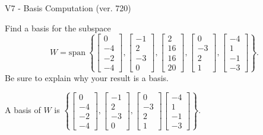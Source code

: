 \begin{exercise}
  \begin{exerciseTitle}V7 - Basis Computation (ver. 720)\end{exerciseTitle}
  \begin{exerciseStatement}
    Find a basis for the subspace 
\[W=\mathrm{span}\ \left\{\left[\begin{array}{r}
0 \\
-4 \\
-2 \\
-4
\end{array}\right] , \left[\begin{array}{r}
-1 \\
2 \\
-3 \\
0
\end{array}\right] , \left[\begin{array}{r}
2 \\
16 \\
16 \\
20
\end{array}\right] , \left[\begin{array}{r}
0 \\
-3 \\
2 \\
1
\end{array}\right] , \left[\begin{array}{r}
-4 \\
1 \\
-1 \\
-3
\end{array}\right]\right\}.\]
 Be sure to explain why your result is a basis.


  \end{exerciseStatement}
  \begin{exerciseAnswer}
   A basis of \(W\) is  \(\left\{\left[\begin{array}{r}
0 \\
-4 \\
-2 \\
-4
\end{array}\right] , \left[\begin{array}{r}
-1 \\
2 \\
-3 \\
0
\end{array}\right] , \left[\begin{array}{r}
0 \\
-3 \\
2 \\
1
\end{array}\right] \left[\begin{array}{r}
-4 \\
1 \\
-1 \\
-3
\end{array}\right]\right\}\).
  


  \end{exerciseAnswer}
\end{exercise}
